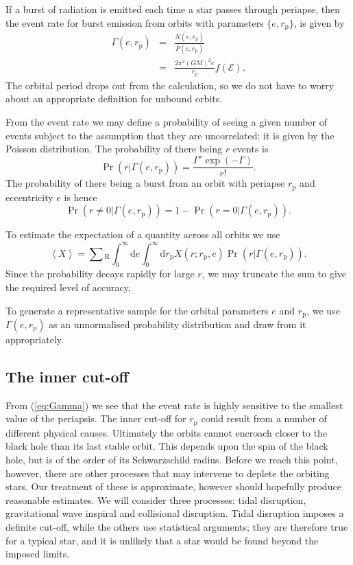\documentclass[useAMS,usedcolumn,usegraphicx,usenatbib]{mn2e}
\newcommand{\eqnref}[1]{(\ref{eq:#1})}
\newcommand{\sub}[1]{\ensuremath{_\mathrm{#1}}}
\newcommand{\dd}{\ensuremath{\mathrm{d}}}
\begin{document}
If a burst of radiation is emitted each time a star passes through periapse, then the event rate for burst emission from orbits with parameters $\{e, r\sub{p}\}$, is given by
\begin{eqnarray}
\Gamma(e, r\sub{p}) &=& \frac{N(e, r\sub{p})}{P(e, r\sub{p})}\\
 &=& \frac{2\pi^2(GM)^2 e}{r\sub{p}}f(\mathcal{E}).
\label{eq:Gamma}
\end{eqnarray}
The orbital period drops out from the calculation, so we do not have to worry about an appropriate definition for unbound orbits.

From the event rate we may define a probability of seeing a given number of events subject to the assumption that they are uncorrelated: it is given by the Poisson distribution. The probability of there being $r$ events is
\begin{equation}
\Pr(r|\Gamma(e, r\sub{p})) = \frac{\Gamma^r\exp(-\Gamma)}{r!}.
\end{equation}
The probability of there being a burst from an orbit with periapse $r\sub{p}$ and eccentricity $e$ is hence
\begin{equation}
\Pr(r \neq 0|\Gamma(e, r\sub{p})) = 1 - \Pr(r = 0|\Gamma(e, r\sub{p})).
\end{equation}

To estimate the expectation of a quantity across all orbits we use
\begin{equation}
\left\langle X\right\rangle = \sum\sub{R} \int_0^\infty \dd e \int_0^\infty \dd r\sub{p} X(r;r\sub{p},e)\Pr(r|\Gamma(e, r\sub{p})).
\end{equation}
Since the probability decays rapidly for large $r$, we may truncate the sum to give the required level of accuracy,

To generate a representative sample for the orbital parameters $e$ and $r\sub{p}$, we use $\Gamma(e, r\sub{p})$ as an unnormalised probability distribution and draw from it appropriately.

\subsection{The inner cut-off}

From \eqnref{Gamma} we see that the event rate is highly sensitive to the smallest value of the periapsis. The inner cut-off for $r\sub{p}$ could result from a number of different physical causes. Ultimately the orbits cannot encroach closer to the black hole than its last stable orbit. This depends upon the spin of the black hole, but is of the order of its Schwarzschild radius. Before we reach this point, however, there are other processes that may intervene to deplete the orbiting stars. Our treatment of these is approximate, however should hopefully produce reasonable estimates. We will consider three processes: tidal disruption, gravitational wave inspiral and collisional disruption. Tidal disruption imposes a definite cut-off, while the others use statistical arguments; they are therefore true for a typical star, and it is unlikely that a star would be found beyond the imposed limits.
\end{document}
